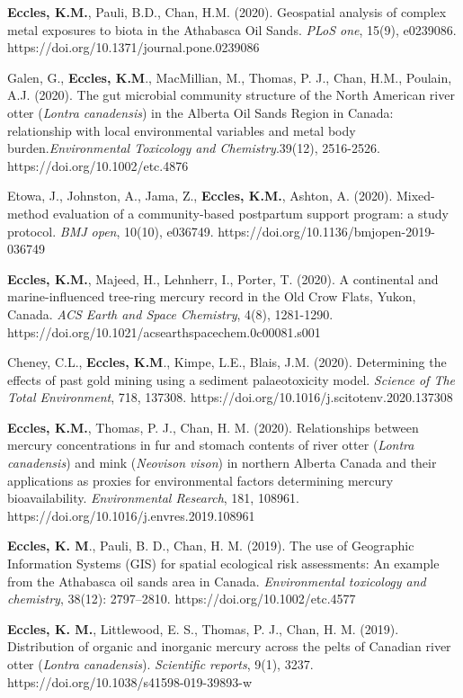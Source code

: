 \documentclass[margin,line]{res}
\begin{document}
\begin{resume}
\textbf{Eccles, K.M.}, Pauli, B.D., Chan, H.M. (2020). Geospatial analysis of complex metal exposures to biota in the Athabasca Oil Sands. \textit{PLoS one}, 15(9), e0239086. \\https://doi.org/10.1371/journal.pone.0239086

Galen, G., \textbf{Eccles, K.M}., MacMillian, M., Thomas, P. J., Chan, H.M., Poulain, A.J. (2020). The gut microbial community structure of the North American river otter (\textit{Lontra canadensis}) in the Alberta Oil Sands Region in Canada: relationship with local environmental variables and metal body burden.\textit{Environmental Toxicology and Chemistry}.39(12), 2516-2526. https://doi.org/10.1002/etc.4876

Etowa, J., Johnston, A., Jama, Z., \textbf{Eccles, K.M.}, Ashton, A. (2020). Mixed-method evaluation of a community-based postpartum support program: a study protocol. \textit{BMJ open}, 10(10), e036749. https://doi.org/10.1136/bmjopen-2019-036749

\textbf{Eccles, K.M.}, Majeed, H., Lehnherr, I., Porter, T. (2020). A continental and marine-influenced tree-ring mercury record in the Old Crow Flats, Yukon, Canada. \textit{ACS Earth and Space Chemistry}, 4(8), 1281-1290. https://doi.org/10.1021/acsearthspacechem.0c00081.s001

Cheney, C.L., \textbf{Eccles, K.M}., Kimpe, L.E., Blais, J.M. (2020). Determining the effects of past gold mining using a sediment palaeotoxicity model. \textit{Science of The Total Environment}, 718, 137308. https://doi.org/10.1016/j.scitotenv.2020.137308

\textbf{Eccles, K.M.}, Thomas, P. J., Chan, H. M. (2020). Relationships between mercury concentrations in fur and stomach contents of river otter (\textit{Lontra canadensis}) and mink (\textit{Neovison vison}) in northern Alberta Canada and their applications as proxies for environmental factors determining mercury bioavailability. \textit{Environmental Research}, 181, 108961. https://doi.org/10.1016/j.envres.2019.108961

\textbf{Eccles, K. M}., Pauli, B. D., Chan, H. M. (2019). The use of Geographic Information Systems (GIS) for spatial ecological risk assessments: An example from the Athabasca oil sands area in Canada. \textit{Environmental toxicology and chemistry}, 38(12): 2797–2810. https://doi.org/10.1002/etc.4577

\textbf{Eccles, K. M.}, Littlewood, E. S., Thomas, P. J., Chan, H. M. (2019). Distribution of organic and inorganic mercury across the pelts of Canadian river otter (\textit{Lontra canadensis}). \textit{Scientific reports}, 9(1), 3237. https://doi.org/10.1038/s41598-019-39893-w


\end{resume}
\end{document}
